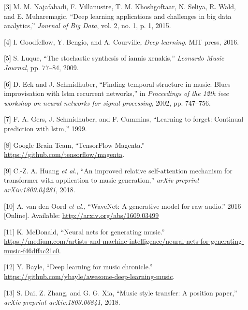 \documentclass[12pt,]{article}
\begin{document}
\leavevmode\hypertarget{ref-najafabadi2015deep}{}%
{[}3{]} M. M. Najafabadi, F. Villanustre, T. M. Khoshgoftaar, N. Seliya,
R. Wald, and E. Muharemagic, ``Deep learning applications and challenges
in big data analytics,'' \emph{Journal of Big Data}, vol. 2, no. 1, p.
1, 2015.

\leavevmode\hypertarget{ref-goodfellow2016deep}{}%
{[}4{]} I. Goodfellow, Y. Bengio, and A. Courville, \emph{Deep
learning}. MIT press, 2016.

\leavevmode\hypertarget{ref-luque2009stochastic}{}%
{[}5{]} S. Luque, ``The stochastic synthesis of iannis xenakis,''
\emph{Leonardo Music Journal}, pp. 77--84, 2009.

\leavevmode\hypertarget{ref-eck2002finding}{}%
{[}6{]} D. Eck and J. Schmidhuber, ``Finding temporal structure in
music: Blues improvisation with lstm recurrent networks,'' in
\emph{Proceedings of the 12th ieee workshop on neural networks for
signal processing}, 2002, pp. 747--756.

\leavevmode\hypertarget{ref-gers1999learning}{}%
{[}7{]} F. A. Gers, J. Schmidhuber, and F. Cummins, ``Learning to
forget: Continual prediction with lstm,'' 1999.

\leavevmode\hypertarget{ref-magenta}{}%
{[}8{]} \relax Google Brain Team, ``TensorFlow Magenta.''
\url{https://github.com/tensorflow/magenta}.

\leavevmode\hypertarget{ref-huang2018improved}{}%
{[}9{]} C.-Z. A. Huang \emph{et al.}, ``An improved relative
self-attention mechanism for transformer with application to music
generation,'' \emph{arXiv preprint arXiv:1809.04281}, 2018.

\leavevmode\hypertarget{ref-oord2016wavenet}{}%
{[}10{]} A. van den Oord \emph{et al.}, ``WaveNet: A generative model
for raw audio.'' 2016 {[}Online{]}. Available:
\url{http://arxiv.org/abs/1609.03499}

\leavevmode\hypertarget{ref-mediumkylemcdonald}{}%
{[}11{]} K. McDonald, ``Neural nets for generating music.'' \\
\url{https://medium.com/artists-and-machine-intelligence/neural-nets-for-generating-music-f46dffac21c0}.

\leavevmode\hypertarget{ref-libdlmusic}{}%
{[}12{]} Y. Bayle, ``Deep learning for music chronicle.'' \\
\url{https://github.com/ybayle/awesome-deep-learning-music}.

\leavevmode\hypertarget{ref-dai2018music}{}%
{[}13{]} S. Dai, Z. Zhang, and G. G. Xia, ``Music style transfer: A
position paper,'' \emph{arXiv preprint arXiv:1803.06841}, 2018.
\end{document}
